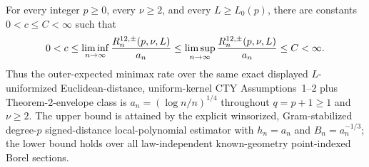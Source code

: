 For every integer \(p\geq0\), every \(\nu\geq2\), and every \(L\geq L_0(p)\), there are constants \(0<c\leq C<\infty\) such that
\[
 0<c\leq\liminf_{n\to\infty}{R^{12,\pm}_n(p,\nu,L)\over a_n}
 \leq\limsup_{n\to\infty}{R^{12,\pm}_n(p,\nu,L)\over a_n}\leq C<\infty.
\]
Thus the outer-expected minimax rate over the same exact displayed \(L\)-uniformized Euclidean-distance, uniform-kernel CTY Assumptions~1--2 plus Theorem-2-envelope class is \(a_n=(\log n/n)^{1/4}\) throughout \(q=p+1\geq1\) and \(\nu\geq2\).  The upper bound is attained by the explicit winsorized, Gram-stabilized degree-\(p\) signed-distance local-polynomial estimator with \(h_n=a_n\) and \(B_n=a_n^{-1/3}\); the lower bound holds over all law-independent known-geometry point-indexed Borel sections.